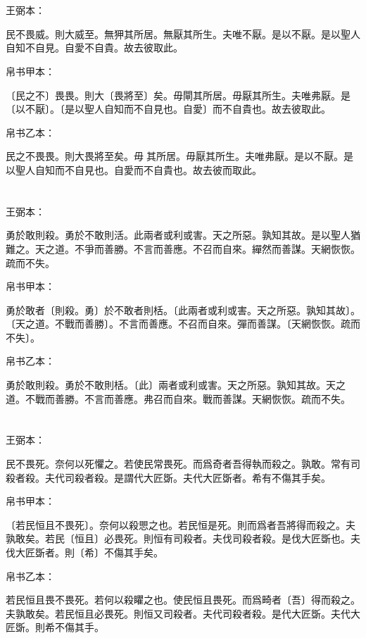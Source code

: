 \documentclass[a5paper]{ctexbook}
\begin{document}
    \chapter{}
    王弼本：

    民不畏威。則大威至。無狎其所居。無厭其所生。夫唯不厭。是以不厭。是以聖人自知不自見。自愛不自貴。故去彼取此。

    
    帛书甲本：

    〔民之不〕畏畏。則大〔畏將至〕矣。毋閘其所居。毋厭其所生。夫唯弗厭。是〔以不厭〕。〔是以聖人自知而不自見也。自愛〕而不自貴也。故去彼取此。

    帛书乙本：

    民之不畏畏。則大畏將至矣。毋𠇺其所居。毋厭其所生。夫唯弗厭。是以不厭。是以聖人自知而不自見也。自愛而不自貴也。故去彼而取此。

    \chapter{}
    王弼本：

    勇於敢則殺。勇於不敢則活。此兩者或利或害。天之所惡。孰知其故。是以聖人猶難之。天之道。不爭而善勝。不言而善應。不召而自來。繟然而善謀。天網恢恢。疏而不失。

    
    帛书甲本：

    勇於敢者〔則殺。勇〕於不敢者則栝。〔此兩者或利或害。天之所惡。孰知其故〕。〔天之道。不戰而善勝〕。不言而善應。不召而自來。彈而善謀。〔天網恢恢。疏而不失〕。

    帛书乙本：

    勇於敢則殺。勇於不敢則栝。〔此〕兩者或利或害。天之所惡。孰知其故。天之道。不戰而善勝。不言而善應。弗召而自來。戰而善謀。天網恢恢。疏而不失。

    \chapter{}
    王弼本：

    民不畏死。奈何以死懼之。若使民常畏死。而爲奇者吾得執而殺之。孰敢。常有司殺者殺。夫代司殺者殺。是謂代大匠斲。夫代大匠斲者。希有不傷其手矣。

    
    帛书甲本：

    〔若民恒且不畏死〕。奈何以殺愳之也。若民恒是死。則而爲者吾將得而殺之。夫孰敢矣。若民〔恒且〕必畏死。則恒有司殺者。夫伐司殺者殺。是伐大匠斲也。夫伐大匠斲者。則〔希〕不傷其手矣。

    帛书乙本：

    若民恒且畏不畏死。若何以殺䂂之也。使民恒且畏死。而爲畸者〔吾〕得而殺之。夫孰敢矣。若民恒且必畏死。則恒又司殺者。夫代司殺者殺。是代大匠斲。夫代大匠斲。則希不傷其手。
\end{document}

